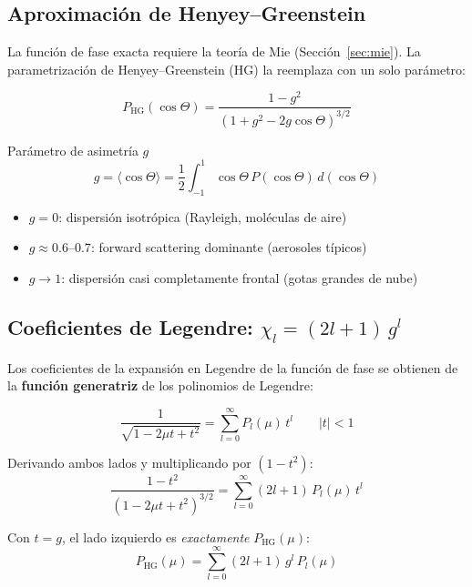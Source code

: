 \documentclass[a4paper,11pt]{article}
\begin{document}
\subsection{Aproximaci\'on de Henyey--Greenstein}

La funci\'on de fase exacta requiere la teor\'ia de Mie (Secci\'on~\ref{sec:mie}).
La parametrizaci\'on de Henyey--Greenstein (HG) la reemplaza con un solo
par\'ametro:

\begin{equation}
    P_{\text{HG}}(\cos\Theta) = \frac{1-g^2}{(1+g^2-2g\cos\Theta)^{3/2}}
\end{equation}

\begin{physics}{Par\'ametro de asimetr\'ia $g$}
\begin{equation}
    g = \langle\cos\Theta\rangle = \frac{1}{2}\int_{-1}^{1}\cos\Theta\,P(\cos\Theta)\,d(\cos\Theta)
\end{equation}
\begin{itemize}
    \item $g=0$: dispersi\'on isotr\'opica (Rayleigh, mol\'eculas de aire)
    \item $g\approx 0.6$--$0.7$: forward scattering dominante (aerosoles t\'ipicos)
    \item $g\to 1$: dispersi\'on casi completamente frontal (gotas grandes de nube)
\end{itemize}
\end{physics}

\subsection{Coeficientes de Legendre: $\chi_l = (2l+1)\,g^l$}

Los coeficientes de la expansi\'on en Legendre de la funci\'on de fase
se obtienen de la \textbf{funci\'on generatriz} de los polinomios de Legendre:

\begin{equation}
    \frac{1}{\sqrt{1 - 2\mu t + t^2}} = \sum_{l=0}^{\infty} P_l(\mu)\,t^l
    \qquad |t| < 1
\end{equation}

Derivando ambos lados y multiplicando por $(1-t^2)$:
\begin{equation}
    \frac{1-t^2}{(1 - 2\mu t + t^2)^{3/2}} = \sum_{l=0}^{\infty}(2l+1)\,P_l(\mu)\,t^l
\end{equation}

Con $t = g$, el lado izquierdo es \emph{exactamente} $P_{\text{HG}}(\mu)$:
\begin{equation}
    P_{\text{HG}}(\mu) = \sum_{l=0}^{\infty}(2l+1)\,g^l\,P_l(\mu)
\end{equation}
\end{document}
